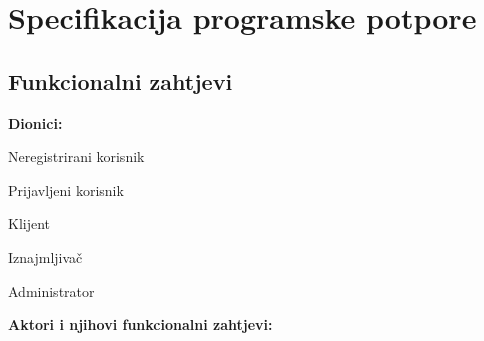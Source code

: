\chapter{Specifikacija programske potpore}
		
	\section{Funkcionalni zahtjevi}
			
			
			
			\noindent \textbf{Dionici:}
			
			\begin{packed_enum}
				
				\item Neregistrirani korisnik
				\item Prijavljeni korisnik
				\item Klijent				
				\item Iznajmljivač
				\item Administrator

				
			\end{packed_enum}
			
			\noindent \textbf{Aktori i njihovi funkcionalni zahtjevi:}
			


